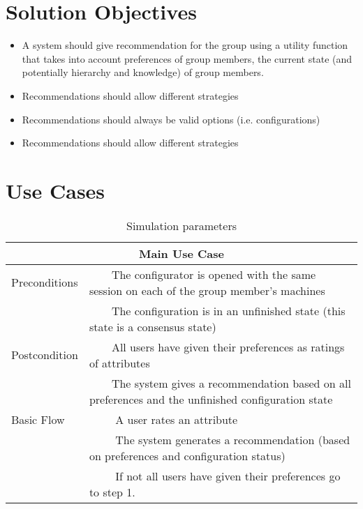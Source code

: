 \documentclass{article}
\newcommand{\tabitem}[1][\textbullet]{~~\llap{#1}~~}
\begin{document}
\section{Solution Objectives}

\begin{itemize}
    \item A system should give recommendation for the group using a utility function that takes into account preferences of group members, the current state (and potentially hierarchy and knowledge)  of group members.
    \item Recommendations should allow different strategies
\end{itemize}

\begin{itemize}
    \item Recommendations should always be valid options (i.e. configurations)
    \item Recommendations should allow different strategies
\end{itemize}

\FloatBarrier

\section{Use Cases}
\begin{table}
    \begin{center}
        \begin{tabularx}{\columnwidth}{l|X}
            \multicolumn{2}{c}{Main Use Case} \\
            \hline
            Preconditions   & \tabitem The configurator is opened with the same session on each of the group member's machines \\
                            & \tabitem The configuration is in an unfinished state (this state is a consensus state)\\
            \hline
            Postcondition   & \tabitem All users have given their preferences as ratings of attributes \\
                            & \tabitem The system gives a recommendation based on all preferences and the unfinished configuration state \\
            \hline
            Basic Flow      & \tabitem[1.] A user rates an attribute \\
                            & \tabitem[2.] The system generates a recommendation (based on preferences and configuration status) \\
                            & \tabitem[3.] If not all users have given their preferences go to step 1. \\
            \hline
        \end{tabularx}
        \caption{Simulation parameters}
        \label{table: simulation parameters}
    \end{center}
\end{table}
\end{document}
